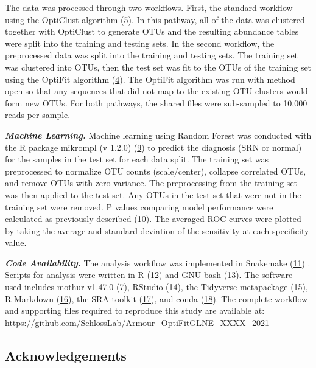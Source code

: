 \documentclass[
]{article}
\begin{document}
The data was processed through two workflows. First, the standard
workflow using the OptiClust algorithm
(\protect\hyperlink{ref-westcott2017}{5}). In this pathway, all of the
data was clustered together with OptiClust to generate OTUs and the
resulting abundance tables were split into the training and testing
sets. In the second workflow, the preprocessed data was split into the
training and testing sets. The training set was clustered into OTUs,
then the test set was fit to the OTUs of the training set using the
OptiFit algorithm (\protect\hyperlink{ref-sovacool2022}{4}). The OptiFit
algorithm was run with method open so that any sequences that did not
map to the existing OTU clusters would form new OTUs. For both pathways,
the shared files were sub-sampled to 10,000 reads per sample.

\textbf{\emph{Machine Learning.}} Machine learning using Random Forest
was conducted with the R package mikrompl (v 1.2.0)
(\protect\hyperlink{ref-topuxe7uoglu2021}{9}) to predict the diagnosis
(SRN or normal) for the samples in the test set for each data split. The
training set was preprocessed to normalize OTU counts (scale/center),
collapse correlated OTUs, and remove OTUs with zero-variance. The
preprocessing from the training set was then applied to the test set.
Any OTUs in the test set that were not in the training set were removed.
P values comparing model performance were calculated as previously
described (\protect\hyperlink{ref-topuxe7uoglu2020}{10}). The averaged
ROC curves were plotted by taking the average and standard deviation of
the sensitivity at each specificity value.

\textbf{\emph{Code Availability.}} The analysis workflow was implemented
in Snakemake (\protect\hyperlink{ref-koster2012}{11}) . Scripts for
analysis were written in R (\protect\hyperlink{ref-R2020}{12}) and GNU
bash (\protect\hyperlink{ref-GNUbash}{13}). The software used includes
mothur v1.47.0 (\protect\hyperlink{ref-schloss2009}{7}), RStudio
(\protect\hyperlink{ref-RStudio2019}{14}), the Tidyverse metapackage
(\protect\hyperlink{ref-wickham2019}{15}), R Markdown
(\protect\hyperlink{ref-xie_r_2018}{16}), the SRA toolkit
(\protect\hyperlink{ref-noauthor_sra-tools_nodate}{17}), and conda
(\protect\hyperlink{ref-noauthor_anaconda_2016}{18}). The complete
workflow and supporting files required to reproduce this study are
available at:
\url{https://github.com/SchlossLab/Armour_OptiFitGLNE_XXXX_2021}

\hypertarget{acknowledgements}{%
\subsection{Acknowledgements}\label{acknowledgements}}
\end{document}

